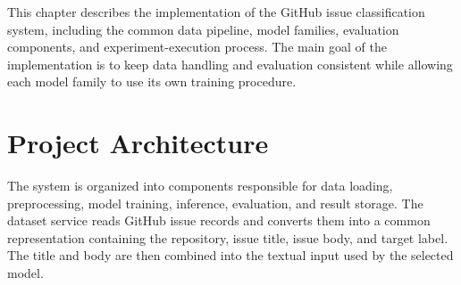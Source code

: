This chapter describes the implementation of the GitHub issue classification system, including the common data pipeline, model families, evaluation components, and experiment-execution process. The main goal of the implementation is to keep data handling and evaluation consistent while allowing each model family to use its own training procedure.

\section{Project Architecture}
The system is organized into components responsible for data loading, preprocessing, model training, inference, evaluation, and result storage. The dataset service reads GitHub issue records and converts them into a common representation containing the repository, issue title, issue body, and target label. The title and body are then combined into the textual input used by the selected model.

